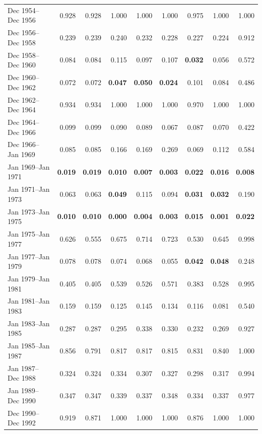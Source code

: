 \begin{table}[p]
\begin{tabular}{lrrrrrrrr}
Dec 1954--Dec 1956 & 0.928 & 0.928 & 1.000 & 1.000 & 1.000 & 0.975 & 1.000 & 1.000 \\
Dec 1956--Dec 1958 & 0.239 & 0.239 & 0.240 & 0.232 & 0.228 & 0.227 & 0.224 & 0.912 \\
Dec 1958--Dec 1960 & 0.084 & 0.084 & 0.115 & 0.097 & 0.107 & \textbf{0.032} & 0.056 & 0.572 \\
Dec 1960--Dec 1962 & 0.072 & 0.072 & \textbf{0.047} & \textbf{0.050} & \textbf{0.024} & 0.101 & 0.084 & 0.486 \\
Dec 1962--Dec 1964 & 0.934 & 0.934 & 1.000 & 1.000 & 1.000 & 0.970 & 1.000 & 1.000 \\
Dec 1964--Dec 1966 & 0.099 & 0.099 & 0.090 & 0.089 & 0.067 & 0.087 & 0.070 & 0.422 \\
Dec 1966--Jan 1969 & 0.085 & 0.085 & 0.166 & 0.169 & 0.269 & 0.069 & 0.112 & 0.584 \\
Jan 1969--Jan 1971 & \textbf{0.019} & \textbf{0.019} & \textbf{0.010} & \textbf{0.007} & \textbf{0.003} & \textbf{0.022} & \textbf{0.016} & \textbf{0.008} \\
Jan 1971--Jan 1973 & 0.063 & 0.063 & \textbf{0.049} & 0.115 & 0.094 & \textbf{0.031} & \textbf{0.032} & 0.190 \\
Jan 1973--Jan 1975 & \textbf{0.010} & \textbf{0.010} & \textbf{0.000} & \textbf{0.004} & \textbf{0.003} & \textbf{0.015} & \textbf{0.001} & \textbf{0.022} \\
Jan 1975--Jan 1977 & 0.626 & 0.555 & 0.675 & 0.714 & 0.723 & 0.530 & 0.645 & 0.998 \\
Jan 1977--Jan 1979 & 0.078 & 0.078 & 0.074 & 0.068 & 0.055 & \textbf{0.042} & \textbf{0.048} & 0.248 \\
Jan 1979--Jan 1981 & 0.405 & 0.405 & 0.539 & 0.526 & 0.571 & 0.383 & 0.528 & 0.995 \\
Jan 1981--Jan 1983 & 0.159 & 0.159 & 0.125 & 0.145 & 0.134 & 0.116 & 0.081 & 0.540 \\
Jan 1983--Jan 1985 & 0.287 & 0.287 & 0.295 & 0.338 & 0.330 & 0.232 & 0.269 & 0.927 \\
Jan 1985--Jan 1987 & 0.856 & 0.791 & 0.817 & 0.817 & 0.815 & 0.831 & 0.840 & 1.000 \\
Jan 1987--Dec 1988 & 0.324 & 0.324 & 0.334 & 0.307 & 0.327 & 0.298 & 0.317 & 0.994 \\
Jan 1989--Dec 1990 & 0.347 & 0.347 & 0.339 & 0.337 & 0.348 & 0.334 & 0.337 & 0.977 \\
Dec 1990--Dec 1992 & 0.919 & 0.871 & 1.000 & 1.000 & 1.000 & 0.876 & 1.000 & 1.000 \\

\end{tabular}
\end{table}
